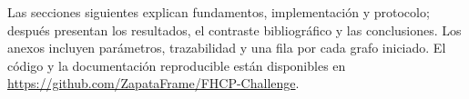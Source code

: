Las secciones siguientes explican fundamentos, implementación y protocolo; después presentan los resultados, el contraste bibliográfico y las conclusiones. Los anexos incluyen parámetros, trazabilidad y una fila por cada grafo iniciado. El código y la documentación reproducible están disponibles en \url{https://github.com/ZapataFrame/FHCP-Challenge}.

